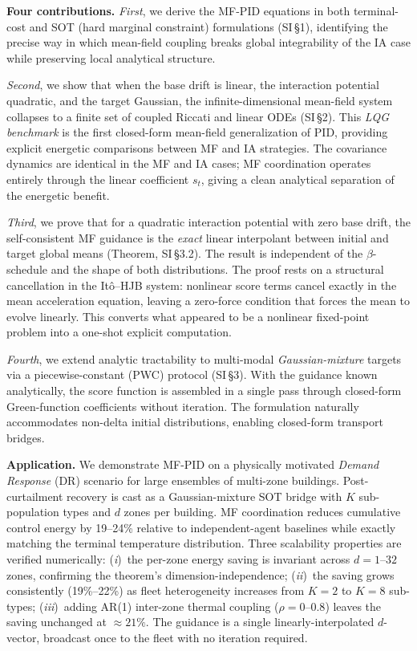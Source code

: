 \documentclass[11pt,onecolumn]{article}
\begin{document}
\textbf{Four contributions.}
\emph{First}, we derive the MF-PID equations in both terminal-cost
and SOT (hard marginal constraint) formulations (SI\,\S1), identifying
the precise way in which mean-field coupling breaks global
integrability of the IA case while preserving local analytical
structure.

\emph{Second}, we show that when the base drift is linear, the
interaction potential quadratic, and the target Gaussian, the
infinite-dimensional mean-field system collapses to a finite set of
coupled Riccati and linear ODEs (SI\,\S2).
This \emph{LQG benchmark} is the first closed-form mean-field
generalization of PID, providing explicit energetic comparisons
between MF and IA strategies.
The covariance dynamics are identical in the MF and IA cases; MF
coordination operates entirely through the linear coefficient $s_t$,
giving a clean analytical separation of the energetic benefit.

\emph{Third}, we prove that for a quadratic interaction potential with
zero base drift, the self-consistent MF guidance is the \emph{exact}
linear interpolant between initial and target global means
(Theorem, SI\,\S3.2).
The result is independent of the $\beta$-schedule and the shape of
both distributions.
The proof rests on a structural cancellation in the It\^o--HJB
system: nonlinear score terms cancel exactly in the mean acceleration
equation, leaving a zero-force condition that forces the mean to
evolve linearly.
This converts what appeared to be a nonlinear fixed-point problem into
a one-shot explicit computation.

\emph{Fourth}, we extend analytic tractability to multi-modal
\emph{Gaussian-mixture} targets via a piecewise-constant (PWC)
protocol (SI\,\S3).
With the guidance known analytically, the score function is assembled
in a single pass through closed-form Green-function coefficients
without iteration.
The formulation naturally accommodates non-delta initial distributions,
enabling closed-form transport bridges.

\textbf{Application.}
We demonstrate MF-PID on a physically motivated \emph{Demand Response}
(DR) scenario for large ensembles of multi-zone buildings.
Post-curtailment recovery is cast as a Gaussian-mixture SOT bridge
with $K$ sub-population types and $d$ zones per building.
MF coordination reduces cumulative control energy by 19--24\%
relative to independent-agent baselines while exactly matching the
terminal temperature distribution.
Three scalability properties are verified numerically:
(\emph{i})~the per-zone energy saving is invariant across $d=1$--$32$
zones, confirming the theorem's dimension-independence;
(\emph{ii})~the saving grows consistently (19\%--22\%) as fleet
heterogeneity increases from $K=2$ to $K=8$ sub-types;
(\emph{iii})~adding AR(1) inter-zone thermal coupling ($\rho=0$--$0.8$)
leaves the saving unchanged at $\approx21\%$.
The guidance is a single linearly-interpolated $d$-vector,
broadcast once to the fleet with no iteration required.
\end{document}
